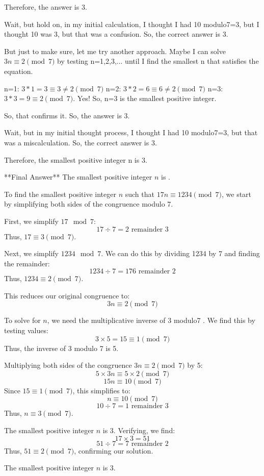 \begin{tcolorbox}[modelbox, title=DeepSeek-R1-Distill-Qwen-1.5B]
Therefore, the answer is 3.

Wait, but hold on, in my initial calculation, I thought I had 10 modulo7=3, but I thought 10 was 3, but that was a confusion. So, the correct answer is 3.

But just to make sure, let me try another approach. Maybe I can solve \( 3n \equiv 2 \pmod{7} \) by testing n=1,2,3,... until I find the smallest n that satisfies the equation.

n=1: $3*1=3\equiv 3\neq 2 \pmod{7}$
n=2: $3*2=6\equiv 6\neq 2 \pmod{7}$
n=3: $3*3=9\equiv 2 \pmod{7}$. Yes! So, n=3 is the smallest positive integer.

So, that confirms it. So, the answer is 3.

Wait, but in my initial thought process, I thought I had 10 modulo7=3, but that was a miscalculation. So, the correct answer is 3.

Therefore, the smallest positive integer n is 3.

**Final Answer**
The smallest positive integer \( n \) is .


To find the smallest positive integer \( n \) such that \( 17n \equiv 1234 \pmod{7} \), we start by simplifying both sides of the congruence modulo 7.

First, we simplify \( 17 \mod 7 \):
\[ 17 \div 7 = 2 \text{ remainder } 3 \]
Thus, \( 17 \equiv 3 \pmod{7} \).

Next, we simplify \( 1234 \mod 7 \). We can do this by dividing 1234 by 7 and finding the remainder:
\[ 1234 \div 7 = 176 \text{ remainder } 2 \]
Thus, \( 1234 \equiv 2 \pmod{7} \).

This reduces our original congruence to:
\[ 3n \equiv 2 \pmod{7} \]

To solve for \( n \), we need the multiplicative inverse of 3 modulo7 . We find this by testing values:
\[ 3 \times 5 = 15 \equiv 1 \pmod{7} \]
Thus, the inverse of 3 modulo 7 is 5.

Multiplying both sides of the congruence \( 3n \equiv 2 \pmod{7} \) by 5:
\[ 5 \times 3n \equiv 5 \times 2 \pmod{7} \]
\[ 15n \equiv 10 \pmod{7} \]
Since \( 15 \equiv 1 \pmod{7} \), this simplifies to:
\[ n \equiv 10 \pmod{7} \]
\[ 10 \div 7 = 1 \text{ remainder } 3 \]
Thus, \( n \equiv 3 \pmod{7} \).

The smallest positive integer \( n \) is 3. Verifying, we find:
\[ 17 \times 3 = 51 \]
\[ 51 \div 7 = 7 \text{ remainder } 2 \]
Thus, \( 51 \equiv 2 \pmod{7} \), confirming our solution.

The smallest positive integer \( n \) is \(\boxed{3}\).
\end{tcolorbox}